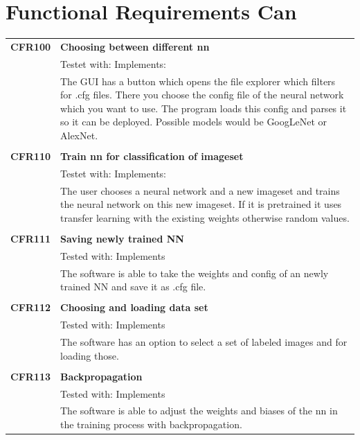 \documentclass[parskip=full]{scrartcl}
\begin{document}
\section{Functional Requirements Can}
\begin{tabular}{p{2cm}p{12cm}}
\textbf{CFR100} & \textbf{Choosing between different \gls{nn}}\\
& Testet with: Implements: \\
& The GUI has a button which opens the file explorer which filters for .cfg files. There you choose the config file of the neural network which you want to use. The program loads this config and parses it so it can be deployed. Possible models would be GoogLeNet or AlexNet.\\
& \\
\textbf{CFR110} & \textbf{Train nn for classification of imageset}\\
& Testet with: Implements: \\
& The user chooses a neural network and a new imageset and trains the neural network on this new imageset. If it is pretrained it uses transfer learning with the existing weights otherwise random values.\\
& \\
\textbf {CFR111} & \textbf{Saving newly trained NN} \\
& Tested with: Implements\\
& The software is able to take the weights and config of an newly trained NN and save it as .cfg file. \\
& \\
\textbf {CFR112} & \textbf{Choosing and loading data set} \\
& Tested with: Implements\\
& The software has an option to select a set of labeled images and for loading those.\\
& \\
\textbf {CFR113} & \textbf{Backpropagation} \\
& Tested with: Implements\\
& The software is able to adjust the weights and biases of the \gls{nn} in the training process with backpropagation.\\
\end{tabular}
\newpage
\end{document}

